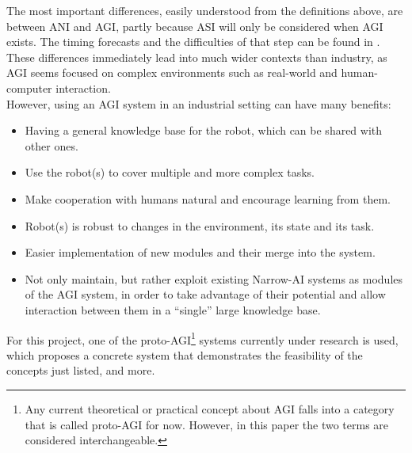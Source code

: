 The most important differences, easily understood from the definitions above, are between ANI and AGI, partly because ASI will only be considered when AGI exists. 
The timing forecasts and the difficulties of that step can be found in \cite{995_experts_opinions}. \\
These differences immediately lead into much wider contexts than industry, as AGI seems focused on complex environments such as real-world and human-computer interaction. \\
However, using an AGI system in an industrial setting can have many benefits:

\begin{itemize}
	\item Having a general knowledge base for the robot, which can be shared with other ones. 
	\item Use the robot(s) to cover multiple and more complex tasks.
	\item Make cooperation with humans natural and encourage learning from them.
	\item Robot(s) is robust to changes in the environment, its state and its task.
	\item Easier implementation of new modules and their merge into the system.
	\item Not only maintain, but rather exploit existing Narrow-AI systems as modules of the AGI system, in order to take advantage of their potential and allow interaction between them in a \enquote{single} large knowledge base.
\end{itemize}

For this project, one of the proto-AGI\footnote{Any current theoretical or practical concept about AGI falls into a category that is called proto-AGI for now. However, in this paper the two terms are considered interchangeable.} systems currently under research is used, which proposes a concrete system that demonstrates the feasibility of the concepts just listed, and more.\\

